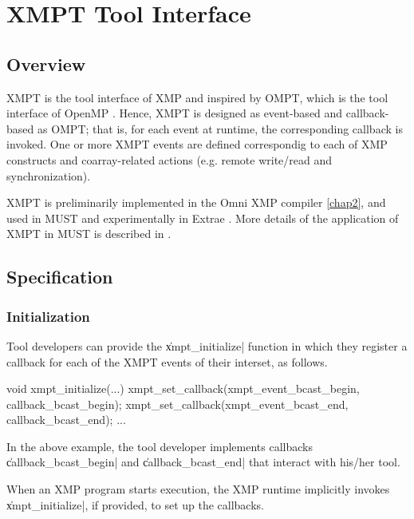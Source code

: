 \section{XMPT Tool Interface}
\label{section:xmpt}


\subsection{Overview}

XMPT is the tool interface of XMP and inspired by OMPT, which is the
tool interface of OpenMP \cite{ompt}.
%
Hence, XMPT is designed as event-based and callback-based as OMPT;
that is, for each event at runtime, the corresponding callback is
invoked. One or more XMPT events are defined correspondig to each of XMP
constructs and coarray-related actions (e.g. remote write/read and
synchronization).

XMPT is preliminarily implemented in the Omni XMP compiler \ref{chap2},
and used in MUST \cite{MUST-project} and experimentally in Extrae
\cite{Extrae-project}. More details of the application of XMPT in MUST 
is described in \label{chapter:mspmd-chapter}.


\subsection{Specification}

\subsubsection{Initialization}

Tool developers can provide the \|xmpt_initialize| function in which
they register a callback for each of the XMPT events of their interset,
as follows.

{\small
\begin{Cexample}
void xmpt_initialize(...){
 xmpt_set_callback(xmpt_event_bcast_begin, callback_bcast_begin);
 xmpt_set_callback(xmpt_event_bcast_end, callback_bcast_end);
 ...
}
\end{Cexample}
}

\sloppy
In the above example, the tool developer implements callbacks\\
\|callback_bcast_begin| and \|callback_bcast_end| that interact with
his/her tool.
\fussy

When an XMP program starts execution, the XMP runtime implicitly invokes
\|xmpt_initialize|, if provided, to set up the callbacks.

